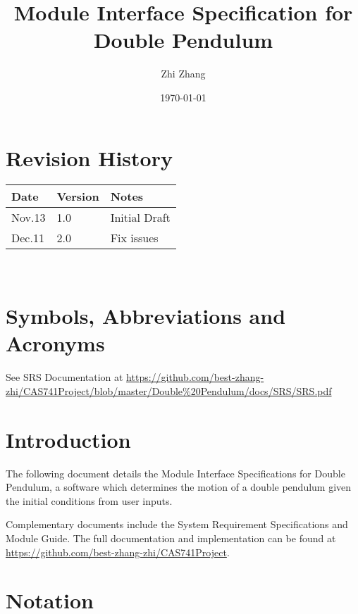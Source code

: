 \documentclass[12pt, titlepage]{article}
\begin{document}
\title{Module Interface Specification for Double Pendulum}

\author{Zhi Zhang}

\date{\today}

\maketitle


\section{Revision History}

\begin{tabularx}{\textwidth}{p{3cm}p{2cm}X}
\toprule {\bf Date} & {\bf Version} & {\bf Notes}\\
\midrule
Nov.13 & 1.0 & Initial Draft\\
Dec.11 & 2.0 & Fix issues\\
\bottomrule
\end{tabularx}

~

\section{Symbols, Abbreviations and Acronyms}

See SRS Documentation at
\url{https://github.com/best-zhang-zhi/CAS741Project/blob/master/Double%20Pendulum/docs/SRS/SRS.pdf}

\newpage

\tableofcontents

\newpage


\section{Introduction}

The following document details the Module Interface Specifications for Double
Pendulum, a software which determines the motion of a double pendulum given the
initial conditions from user inputs.

Complementary documents include the System Requirement Specifications
and Module Guide.  The full documentation and implementation can be
found at \url{https://github.com/best-zhang-zhi/CAS741Project}.  

\section{Notation}
\end{document}
